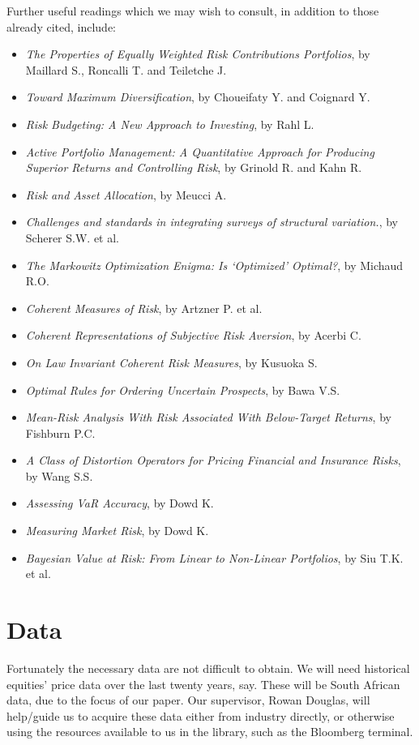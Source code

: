 \documentclass[12pt,a4paper]{article}
\newcommand{\bi}{\begin{itemize}}
\newcommand{\ei}{\end{itemize}}
\begin{document}
Further useful readings which we may wish to consult, in addition to those already cited, include: 
\bi
\item  \textit{The Properties of Equally Weighted Risk Contributions Portfolios}, by Maillard S., Roncalli T. and Teiletche J. 
\item \textit{Toward Maximum Diversification}, by Choueifaty Y. and Coignard Y.
\item \textit{Risk Budgeting: A New Approach to Investing}, by Rahl L.
\item \textit{Active Portfolio Management: A Quantitative Approach for Producing Superior Returns and Controlling Risk}, by Grinold R. and Kahn R.
\item \textit{Risk and Asset Allocation}, by Meucci A.
\item \textit{Challenges and standards in integrating surveys of structural variation.}, by Scherer S.W. et al.
\item \textit{The Markowitz Optimization Enigma: Is ‘Optimized’ Optimal?}, by Michaud R.O.
\item \textit{Coherent Measures of Risk}, by Artzner P. et al.
\item \textit{Coherent Representations of Subjective Risk Aversion}, by Acerbi C. 
\item  \textit{On Law Invariant Coherent Risk Measures}, by Kusuoka S.
\item  \textit{Optimal Rules for Ordering Uncertain Prospects}, by Bawa V.S.
\item \textit{Mean-Risk Analysis With Risk Associated With Below-Target Returns}, by Fishburn P.C.
\item  \textit{A Class of Distortion Operators for Pricing Financial and Insurance Risks}, by Wang S.S.
\item  \textit{Assessing VaR Accuracy}, by Dowd K.
\item  \textit{Measuring Market Risk}, by Dowd K. 
\item \textit{Bayesian Value at Risk: From Linear to Non-Linear Portfolios}, by Siu T.K. et al.
\ei

\section{Data}
\label{sec:Data}

Fortunately the necessary data are not difficult to obtain. We will need historical equities' price data over the last twenty years, say. These will be South African data, due to the focus of our paper. Our supervisor, Rowan Douglas, will help/guide us to acquire these data either from industry directly, or otherwise using the resources available to us in the library, such as the Bloomberg terminal. 
\end{document}
